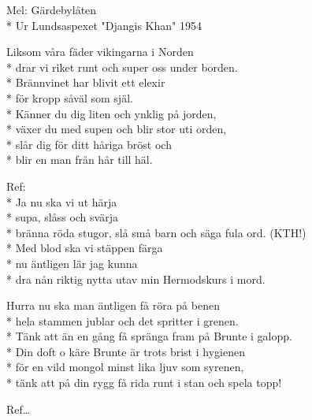\begin{SongText}[Härjarvisan]
    \begin{SongInfo}
        Mel: Gärdebylåten\\*%
        Ur Lundsaspexet "Djangis Khan" 1954
    \end{SongInfo}
    \begin{SongVerse}
        Liksom våra fäder vikingarna i Norden\\*%
        drar vi riket runt och super oss under borden.\\*%
        Brännvinet har blivit ett elexir\\*%
        för kropp såväl som själ.\\*%
        Känner du dig liten och ynklig på jorden,\\*%
        växer du med supen och blir stor uti orden,\\*%
        slår dig för ditt håriga bröst och\\*%
        blir en man från hår till häl.
    \end{SongVerse}
    \begin{SongVerse}
        Ref:\\*%
        Ja nu ska vi ut härja\\*%
        supa, slåss och svärja\\*%
        bränna röda stugor, slå små barn och säga fula ord. (KTH!)\\*%
        Med blod ska vi stäppen färga\\*%
        nu äntligen lär jag kunna\\*%
        dra nån riktig nytta utav min Hermodskurs i mord.
    \end{SongVerse}
    \begin{SongVerse}
        Hurra nu ska man äntligen få röra på benen\\*%
        hela stammen jublar och det spritter i grenen.\\*%
        Tänk att än en gång få spränga fram på Brunte i galopp.\\*%
        Din doft o käre Brunte är trots brist i hygienen\\*%
        för en vild mongol minst lika ljuv som syrenen,\\*%
        tänk att på din rygg få rida runt i stan och spela topp!
    \end{SongVerse}
    \begin{SongVerse}
        Ref…
    \end{SongVerse}
    \begin{SongVerse}

\end{SongVerse}
\end{SongText}
